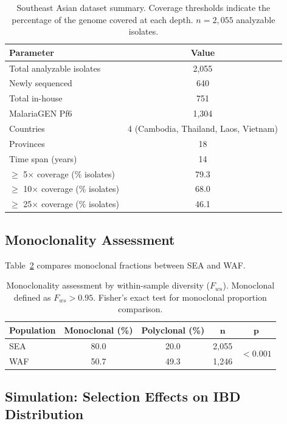 \documentclass[11pt]{article}
\begin{document}
\begin{table}[H]
\centering
\caption{Southeast Asian dataset summary. Coverage thresholds indicate the percentage of the genome covered at each depth. $n = 2{,}055$ analyzable isolates.}
\label{tab:dataset}
\begin{tabular}{lc}
\toprule
\textbf{Parameter} & \textbf{Value} \\
\midrule
Total analyzable isolates & 2,055 \\
Newly sequenced & 640 \\
Total in-house & 751 \\
MalariaGEN Pf6 & 1,304 \\
Countries & 4 (Cambodia, Thailand, Laos, Vietnam) \\
Provinces & 18 \\
Time span (years) & 14 \\
$\geq$ 5$\times$ coverage (\% isolates) & 79.3 \\
$\geq$ 10$\times$ coverage (\% isolates) & 68.0 \\
$\geq$ 25$\times$ coverage (\% isolates) & 46.1 \\
\bottomrule
\end{tabular}
\end{table}

\subsection{Monoclonality Assessment}

Table~\ref{tab:monoclonal} compares monoclonal fractions between SEA and WAF.

\begin{table}[H]
\centering
\caption{Monoclonality assessment by within-sample diversity ($F_{ws}$). Monoclonal defined as $F_{ws} > 0.95$. Fisher's exact test for monoclonal proportion comparison.}
\label{tab:monoclonal}
\begin{tabular}{lcccc}
\toprule
\textbf{Population} & \textbf{Monoclonal (\%)} & \textbf{Polyclonal (\%)} & $\boldsymbol{n}$ & $\boldsymbol{p}$ \\
\midrule
SEA & 80.0 & 20.0 & 2,055 & \multirow{2}{*}{$< 0.001$} \\
WAF & 50.7 & 49.3 & 1,246 & \\
\bottomrule
\end{tabular}
\end{table}

\subsection{Simulation: Selection Effects on IBD Distribution}
\end{document}
